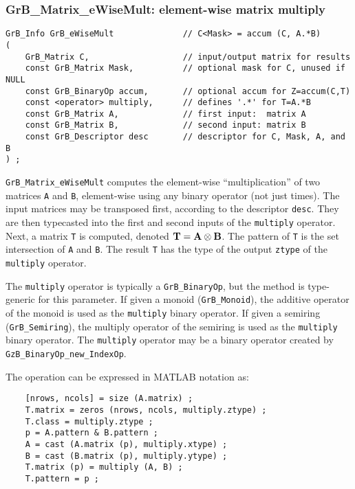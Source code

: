 \documentclass[12pt]{article}
\begin{document}
\newpage
\subsubsection{{\sf GrB\_Matrix\_eWiseMult:} element-wise matrix multiply}
\label{eWiseMult_matrix}

\begin{mdframed}[userdefinedwidth=6in]
{\footnotesize
\begin{verbatim}
GrB_Info GrB_eWiseMult              // C<Mask> = accum (C, A.*B)
(
    GrB_Matrix C,                   // input/output matrix for results
    const GrB_Matrix Mask,          // optional mask for C, unused if NULL
    const GrB_BinaryOp accum,       // optional accum for Z=accum(C,T)
    const <operator> multiply,      // defines '.*' for T=A.*B
    const GrB_Matrix A,             // first input:  matrix A
    const GrB_Matrix B,             // second input: matrix B
    const GrB_Descriptor desc       // descriptor for C, Mask, A, and B
) ;
\end{verbatim}
} \end{mdframed}

\verb'GrB_Matrix_eWiseMult' computes the element-wise ``multiplication'' of two
matrices \verb'A' and \verb'B', element-wise using any binary operator (not
just times).  The input matrices may be transposed first, according to the
descriptor \verb'desc'.  They are then typecasted into the first and second
inputs of the \verb'multiply' operator.  Next, a matrix \verb'T' is computed,
denoted ${\bf T = A \otimes B}$.  The pattern of \verb'T' is the set
intersection of \verb'A' and \verb'B'.  The result \verb'T' has the type of the
output \verb'ztype' of the \verb'multiply' operator.

The \verb'multiply' operator is typically a \verb'GrB_BinaryOp', but the method
is type-generic for this parameter.  If given a monoid (\verb'GrB_Monoid'), the
additive operator of the monoid is used as the \verb'multiply' binary operator.
If given a semiring (\verb'GrB_Semiring'), the multiply operator of the
semiring is used as the \verb'multiply' binary operator.
%
The \verb'multiply' operator may be a binary operator
created by \verb'GzB_BinaryOp_new_IndexOp'.

\vspace{0.05in}
The operation can be expressed in MATLAB notation as:
    {\footnotesize
    \begin{verbatim}
    [nrows, ncols] = size (A.matrix) ;
    T.matrix = zeros (nrows, ncols, multiply.ztype) ;
    T.class = multiply.ztype ;
    p = A.pattern & B.pattern ;
    A = cast (A.matrix (p), multiply.xtype) ;
    B = cast (B.matrix (p), multiply.ytype) ;
    T.matrix (p) = multiply (A, B) ;
    T.pattern = p ; \end{verbatim} }
\end{document}
